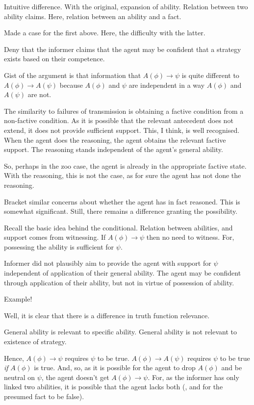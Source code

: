 \documentclass[10pt]{article}
\newcommand{\hozlinedash}[0]{%
  \noindent\hdashrule[0.5ex][c]{\textwidth}{.1pt}{2.5pt}
}
\begin{document}
Intuitive difference.
With the original, expansion of ability.
Relation between two ability claims.
Here, relation between an ability and a fact.

Made a case for the first above.
Here, the difficulty with the latter.

Deny that the informer claims that the agent may be confident that a strategy exists based on their competence.

Gist of the argument is that information that \(A(\phi) \rightarrow \psi\) is quite different to \(A(\phi) \rightarrow A(\psi)\) because \(A(\phi)\) and \(\psi\) are independent in a way \(A(\phi)\) and \(A(\psi)\) are not.

{
  \color{red}
  The similarity to failures of transmission is obtaining a factive condition from a non-factive condition.
  As it is possible that the relevant antecedent does not extend, it does not provide sufficient support.
  This, I think, is well recognised.
  When the agent does the reasoning, the agent obtains the relevant factive support.
  The reasoning stands independent of the agent's general ability.

  So, perhaps in the zoo case, the agent is already in the appropriate factive state.
  With the reasoning, this is not the case, as for sure the agent has not done the reasoning.

  Bracket similar concerns about whether the agent has in fact reasoned.
  This is somewhat significant.
  Still, there remains a difference granting the possibility.
}

\hozlinedash

Recall the basic idea behind the conditional.
Relation between abilities, and support comes from witnessing.
If \(A(\phi) \rightarrow \psi\) then no need to witness.
For, possessing the ability is sufficient for \(\psi\).

Informer did not plausibly aim to provide the agent with support for \(\psi\) independent of application of their general ability.
The agent may be confident through application of their ability, but not in virtue of possession of ability.

\hozlinedash

Example!


Well, it is clear that there is a difference in truth function relevance.

General ability is relevant to specific ability.
General ability is not relevant to existence of strategy.

Hence, \(A(\phi) \rightarrow \psi\) requires \(\psi\) to be true.
\(A(\phi) \rightarrow A(\psi)\) requires \(\psi\) to be true \emph{if} \(A(\phi)\) is true.
And, so, as it is possible for the agent to drop \(A(\phi)\) and be neutral on \(\psi\), the agent doesn't get \(A(\phi) \rightarrow \psi\).
For, as the informer has only linked two abilities, it is possible that the agent lacks both (, and for the presumed fact to be false).
\end{document}
